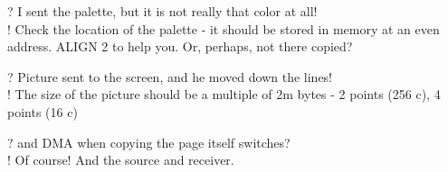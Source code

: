 ? I sent the palette, but it is not really that color at all!\\
! Check the location of the palette - it should be stored in memory at
an even address. ALIGN 2 to help you. Or, perhaps, not there copied?

? Picture sent to the screen, and he moved down the lines!\\
! The size of the picture should be a multiple of 2m bytes - 2 points
(256 c), 4 points (16 c)

? and DMA when copying the page itself switches?\\
! Of course! And the source and receiver.
